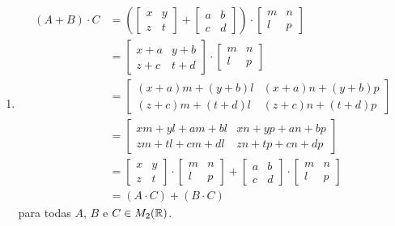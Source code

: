 \documentclass[12pt]{exam}
\begin{document}
\begin{enumerate}[label={\roman*})]
    \item
    \begin{align*}
        (A + B)\cdot C &= \left(\begin{bmatrix}
        x & y\\z & t 
    \end{bmatrix} + \begin{bmatrix}
        a & b\\c & d 
    \end{bmatrix}\right)\cdot \begin{bmatrix}
        m & n\\
        l & p
    \end{bmatrix}\\ &= \begin{bmatrix}
        x + a & y + b\\z + c & t + d 
    \end{bmatrix}\cdot \begin{bmatrix}
        m & n\\
        l & p
    \end{bmatrix}\\ &= \begin{bmatrix}
        (x + a)m + (y + b)l & (x + a)n + (y + b)p\\
        (z + c)m + (t + d)l & (z + c)n + (t + d)p
    \end{bmatrix}\\ &= \begin{bmatrix}
        xm + yl + am + bl & xn + yp + an + bp\\
        zm + tl + cm + dl & zn + tp + cn + dp
    \end{bmatrix}\\ &= \begin{bmatrix}
        x & y\\z & t 
    \end{bmatrix}\cdot \begin{bmatrix}
        m & n\\
        l & p
    \end{bmatrix} + \begin{bmatrix}
        a & b\\c & d 
    \end{bmatrix}\cdot \begin{bmatrix}
        m & n\\
        l & p
    \end{bmatrix}\\ &= (A\cdot C) + (B \cdot C)
    \end{align*}
    para todas $A$, $B$ e $C \in M_2(\mathbb{R})$.


\end{enumerate}
\end{document}
